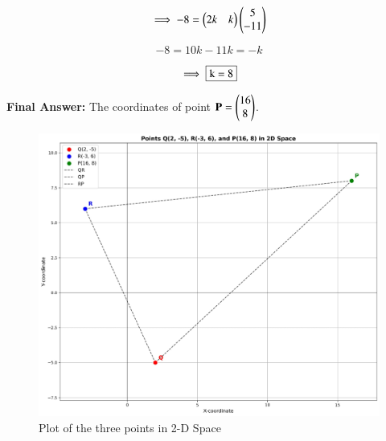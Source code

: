 \documentclass[journal,12pt,onecolumn]{IEEEtran}
\theoremstyle{remark}
\begin{document}
\begin{equation}
    \implies -8 = \begin{pmatrix}2k&k\end{pmatrix}\begin{pmatrix}5\\-11\end{pmatrix}
\end{equation}

\begin{equation}
    -8 = 10k - 11k = -k
\end{equation}

\begin{equation}
    \implies \fbox{k = 8}
\end{equation}
   

\bigskip

\textbf{Final Answer: }
The coordinates of point $\mathbf{P} = \begin{pmatrix}16\\8\end{pmatrix}$.

\begin{figure}
    \centering
    \includegraphics[width=1\columnwidth]{figs/1.jpg}
    \caption{Plot of the three points in 2-D Space}
    \label{fig:placeholder}
\end{figure}
\end{document}
